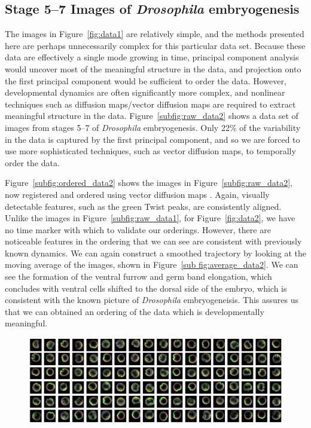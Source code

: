 \documentclass{pnastwo}
\begin{document}
\begin{article}
\subsection{Stage 5--7 Images of {\it Drosophila} embryogenesis}

The images in Figure~\ref{fig:data1} are relatively simple, and the methods presented here are perhaps unnecessarily complex for this particular data set. 
%
Because these data are effectively a single mode growing in time,
principal component analysis \cite{shlens2005tutorial} would uncover most of the meaningful structure in the data, and projection onto the first principal component would be sufficient to order the data.
%
However, developmental dynamics are often significantly more complex, and nonlinear techniques such as diffusion maps/vector diffusion maps are required to extract meaningful structure in the data. 
%
Figure~\ref{subfig:raw_data2} shows a data set of images from stages 5--7 of {\it Drosophila} embryogenesis.
%
Only 22\% of the variability in the data is captured by the first principal component, and so we are forced to use more sophisticated techniques, such as vector diffusion maps, to temporally order the data.

Figure~\ref{subfig:ordered_data2} shows the images in Figure~\ref{subfig:raw_data2}, now registered and ordered using vector diffusion maps \cite{singer2012vector}.
%
Again, visually detectable features, such as the green Twist peaks, are consistently aligned. 
%
Unlike the images in Figure~\ref{subfig:raw_data1}, 
for Figure~\ref{fig:data2}, we have no time marker with which to validate our orderings.
%
However, there are noticeable features in the ordering that we can see are consistent with previously known dynamics.
%
We can again construct a smoothed trajectory by looking at the moving average of the images, shown in Figure~\ref{sub fig:average_data2}.
%
We can see the formation of the ventral furrow and germ band elongation, which concludes with ventral cells shifted to the dorsal side of the embryo, which is consistent with the known picture of {\it Drosophila} embryogeneisis. 
%
This assures us that we can obtained an ordering of the data which is developmentally meaningful. 

\newpage
\begin{figure}[t]
\includegraphics[width=16.8cm]{raw_data2}


\end{figure}
\end{article}
\end{document}
